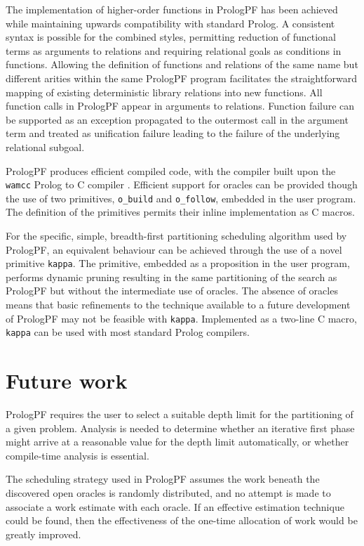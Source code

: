 The implementation of higher-order functions in PrologPF has been achieved while
maintaining upwards compatibility with standard Prolog.  A consistent syntax is
possible for the combined styles, permitting reduction of functional terms as
arguments to relations and requiring relational goals as conditions in functions.
Allowing the definition of functions and relations of the same name but different arities
within the same PrologPF program facilitates the straightforward mapping of existing
deterministic library relations into new functions.  All function calls in PrologPF
appear in arguments to relations. Function failure can be supported as an exception
propagated to the outermost call in the argument term and
treated as unification failure leading to the failure of the underlying relational
subgoal.

PrologPF produces efficient compiled code, with the compiler built upon the
\texttt{wamcc} Prolog to C compiler .  Efficient support for
oracles can be provided though the use of two primitives, \texttt{o\_{}build}
and \texttt{o\_{}follow}, embedded in the user program.  The definition of the
primitives permits their inline implementation as C macros.

For the specific, simple, breadth-first partitioning scheduling algorithm used by
PrologPF, an equivalent behaviour can be achieved through the use of a novel primitive
\texttt{kappa}.  The primitive, embedded as a proposition in the user program, performs
dynamic pruning resulting in the same partitioning of the search as PrologPF but without
the intermediate use of oracles.  The absence of oracles means that basic refinements
to the technique available to a future development of PrologPF may not be feasible with
\texttt{kappa}.  Implemented as a two-line C macro, \texttt{kappa} can be used with
most standard Prolog compilers.

\section{Future work} %

PrologPF requires the user to select a suitable depth limit for the partitioning
of a given problem.  Analysis is needed to determine whether an iterative first
phase might arrive at a reasonable value for the depth limit automatically, or
whether compile-time analysis is essential.

The scheduling strategy used in PrologPF assumes the work beneath the
discovered open oracles is randomly distributed, and no attempt is made to
associate a work estimate with each oracle.  If an effective estimation technique
could be found, then the effectiveness of the one-time allocation of work would be
greatly improved.

